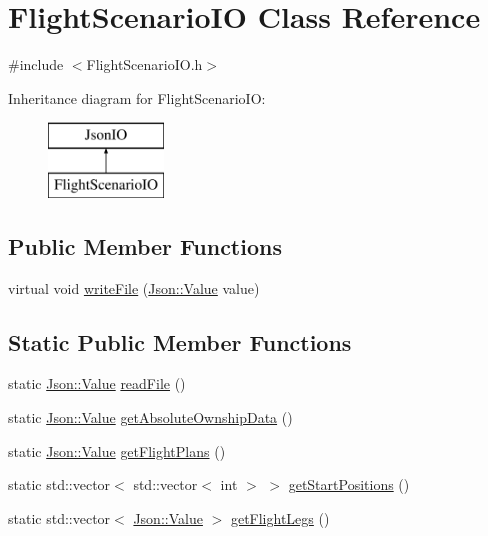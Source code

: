 \hypertarget{class_flight_scenario_i_o}{}\section{Flight\+Scenario\+I\+O Class Reference}
\label{class_flight_scenario_i_o}


{\ttfamily \#include $<$Flight\+Scenario\+I\+O.\+h$>$}

Inheritance diagram for Flight\+Scenario\+I\+O\+:\begin{figure}[H]
\begin{center}
\leavevmode
\includegraphics[height=2.000000cm]{class_flight_scenario_i_o}
\end{center}
\end{figure}
\subsection*{Public Member Functions}
\begin{DoxyCompactItemize}
\item 
virtual void \hyperlink{class_flight_scenario_i_o_a391009055a8c4973de8f61a4cef015a6}{write\+File} (\hyperlink{class_json_1_1_value}{Json\+::\+Value} value)
\end{DoxyCompactItemize}
\subsection*{Static Public Member Functions}
\begin{DoxyCompactItemize}
\item 
static \hyperlink{class_json_1_1_value}{Json\+::\+Value} \hyperlink{class_flight_scenario_i_o_ab4cd400bd08c78fd6e88d8eaa7bbe6dc}{read\+File} ()
\item 
static \hyperlink{class_json_1_1_value}{Json\+::\+Value} \hyperlink{class_flight_scenario_i_o_a98f00808674c8239c9aede07c29576b0}{get\+Absolute\+Ownship\+Data} ()
\item 
static \hyperlink{class_json_1_1_value}{Json\+::\+Value} \hyperlink{class_flight_scenario_i_o_a51ff32ca2f45f95b843fb7a9966e3734}{get\+Flight\+Plans} ()
\item 
static std\+::vector$<$ std\+::vector$<$ int $>$ $>$ \hyperlink{class_flight_scenario_i_o_a81094ac93be8c44464dff144262f9680}{get\+Start\+Positions} ()
\item 
static std\+::vector$<$ \hyperlink{class_json_1_1_value}{Json\+::\+Value} $>$ \hyperlink{class_flight_scenario_i_o_a3b65c0985f1adc92b3d5f9109c842c8d}{get\+Flight\+Legs} ()
\end{DoxyCompactItemize}


